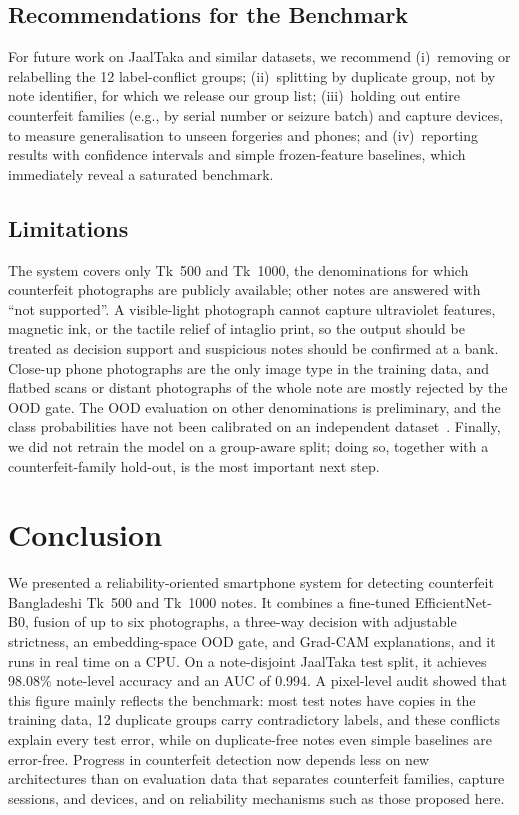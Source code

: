 \documentclass[journal]{IEEEtran}
\begin{document}
\subsection{Recommendations for the Benchmark}
For future work on JaalTaka and similar datasets, we recommend (i)~removing or
relabelling the 12 label-conflict groups; (ii)~splitting by duplicate group, not by
note identifier, for which we release our group list; (iii)~holding out entire
counterfeit families (e.g., by serial number or seizure batch) and capture devices, to
measure generalisation to unseen forgeries and phones; and (iv)~reporting results with
confidence intervals and simple frozen-feature baselines, which immediately reveal a
saturated benchmark.

\subsection{Limitations}
The system covers only Tk~500 and Tk~1000, the denominations for which counterfeit
photographs are publicly available; other notes are answered with ``not supported''. A
visible-light photograph cannot capture ultraviolet features, magnetic ink, or the
tactile relief of intaglio print, so the output should be treated as decision support
and suspicious notes should be confirmed at a bank. Close-up phone photographs are the
only image type in the training data, and flatbed scans or distant photographs of the
whole note are mostly rejected by the OOD gate. The OOD evaluation on other
denominations is preliminary, and the class probabilities have not been calibrated on
an independent dataset~\cite{guo2017calibration}. Finally, we did not retrain the model
on a group-aware split; doing so, together with a counterfeit-family hold-out, is the
most important next step.

\section{Conclusion}
\label{sec:conclusion}

We presented a reliability-oriented smartphone system for detecting counterfeit
Bangladeshi Tk~500 and Tk~1000 notes. It combines a fine-tuned EfficientNet-B0,
fusion of up to six photographs, a three-way decision with adjustable strictness, an
embedding-space OOD gate, and Grad-CAM explanations, and it runs in real time on a
CPU. On a note-disjoint JaalTaka test split, it achieves 98.08\% note-level accuracy
and an AUC of 0.994. A pixel-level audit showed that this figure mainly reflects the
benchmark: most test notes have copies in the training data, 12 duplicate groups carry
contradictory labels, and these conflicts explain every test error, while on
duplicate-free notes even simple baselines are error-free. Progress in counterfeit
detection now depends less on new architectures than on evaluation data that separates
counterfeit families, capture sessions, and devices, and on reliability mechanisms such
as those proposed here.
\end{document}
